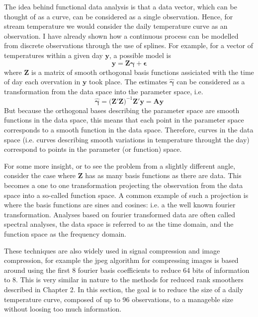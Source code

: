 The idea behind functional data analysis is that a data vector, which can be thought of as a curve, can be considered as a single observation.  Hence, for stream temperature we would consider the daily temperature curve as an observation.  I have already shown how a continuous process can be modelled from discrete observations through the use of splines.  For example, for a vector of temperatures within a given day $\bm{y}$, a possible model is
\begin{equation}
   \bm{y} = \bm{Z} \bm{\gamma} + \bm{\epsilon}
\end{equation}
where $\bm{Z}$ is a matrix of smooth orthogonal basis functions assiciated with the time of day each overvation in $\bm{y}$ took place.  The estimates $\hat{\bm{\gamma}}$ can be considered as a transformation from the data space into the parameter space, i.e.
\begin{equation}
   \hat{\bm{\gamma}} = \Big(\bm{Z}'\bm{Z}\Big)^{-1} \bm{Z}' \bm{y} = \bm{A} \bm{y}
\end{equation}
But because the orthogonal bases describing the parameter space are smooth functions in the data space, this means that each point in the parameter space corresponds to a smooth function in the data space.  Therefore, curves in the data space (i.e. curves describing smooth variations in temperature throught the day) correspond to points in the parameter (or function) space.

For some more insight, or to see the problem from a slightly different angle, consider the case where $\bm{Z}$ has as many basis functions as there are data.  This becomes a one to one transformation projecting the observation from the data space into a so-called function space.  A common example of such a projection is where the basis functions are sines and cosines: i.e. a the well known fourier transformation.  Analyses based on fourier transformed data are often called spectral analyses, the data space is referred to as the time domain, and the function space as the frequency domain.  

These techniques are also widely used in signal compression and image compression, for example the jpeg algorithm for compressing images is based around using the first 8 fourier basis coefficients to reduce 64 bits of information to 8.  This is very similar in nature to the methods for reduced rank smoothers described in Chapter 2.  In this section, the goal is to reduce the size of a daily temperature curve, composed of up to 96 observations, to a manageble size without loosing too much information.


